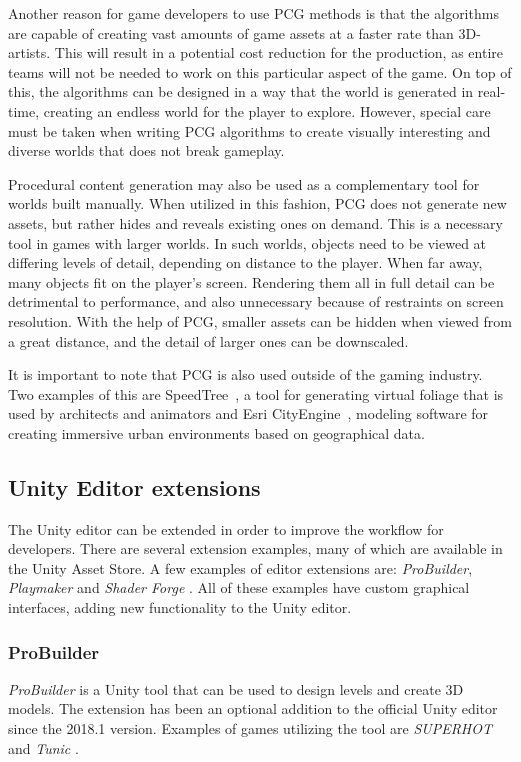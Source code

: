 Another reason for game developers to use PCG methods is that the algorithms are capable of creating vast amounts of game assets at a faster rate than 3D-artists. This will result in a potential cost reduction for the production, as entire teams will not be needed to work on this particular aspect of the game. On top of this, the algorithms can be designed in a way that the world is generated in real-time, creating an endless world for the player to explore. However, special care must be taken when writing PCG algorithms to create visually interesting and diverse worlds that does not break gameplay.

Procedural content generation may also be used as a complementary tool for worlds built manually. When utilized in this fashion, PCG does not generate new assets, but rather hides and reveals existing ones on demand. This is a necessary tool in games with larger worlds. In such worlds, objects need to be viewed at differing levels of detail, depending on distance to the player. When far away, many objects fit on the player's screen. Rendering them all in full detail can be detrimental to performance, and also unnecessary because of restraints on screen resolution. With the help of PCG, smaller assets can be hidden when viewed from a great distance, and the detail of larger ones can be downscaled. \cite[p. 57]{shaker2016procedural}

It is important to note that PCG is also used outside of the gaming industry. Two examples of this are SpeedTree~\cite{SpeedTree}, a tool for generating virtual foliage that is used by architects and animators and Esri CityEngine~\cite{CityEngine}, modeling software for creating immersive urban environments based on geographical data.

\subsection{Unity Editor extensions}
The Unity editor can be extended in order to improve the workflow for developers. There are several extension examples, many of which are available in the Unity Asset Store. A few examples of editor extensions are: \textit{ProBuilder}, \textit{Playmaker} and \textit{Shader Forge} \cite{unity-probuilder, unity-hutong-playmaker, unity-shadow-forge}. All of these examples have custom graphical interfaces, adding new functionality to the Unity editor.

\subsubsection{ProBuilder}
\textit{ProBuilder} is a Unity tool that can be used to design levels and create 3D models. The extension has been an optional addition to the official Unity editor since the 2018.1 version. Examples of games utilizing the tool are \textit{SUPERHOT} and \textit{Tunic} \cite{unity-probuilder}.

